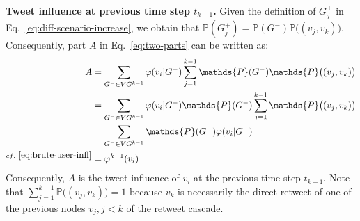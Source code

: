 \textbf{Tweet influence at previous time step $t_{k-1}$.}
Given the definition of $G_j^+$ in Eq.~\eqref{eq:diff-scenario-increase}, we obtain that $\mathds{P}(G_j^+) = \mathds{P}(G^-)\mathds{P}\big((v_j,v_k)\big)$.
Consequently, part $A$ in Eq.~\eqref{eq:two-parts} can be written as:
\begin{align}
	A 	&= \sum_{G^- \in {VG^{k-1}}} \varphi(v_i | G^-) \sum^{k-1}_{j=1} \mathds{P}(G^-)\mathds{P}\big((v_j,v_k)\big) \nonumber \\
		&= \sum_{G^- \in {VG^{k-1}}} \varphi(v_i | G^-) \mathds{P}(G^-) \sum^{k-1}_{j=1} \mathds{P}\big((v_j,v_k)\big) \nonumber \\
		&= \sum_{G^- \in {VG^{k-1}}} \mathds{P}(G^-) \varphi(v_i | G^-)  \nonumber \\
	^{cf.~\eqref{eq:brute-user-infl}}	&= \varphi^{k-1}(v_i) \label{eq:past-infl}
\end{align}
Consequently, $A$ is the tweet influence of $v_i$ at the previous time step $t_{k-1}$.
Note that $\sum^{k-1}_{j=1} \mathds{P}\big((v_j,v_k)\big) = 1$ because $v_k$ is necessarily the direct retweet of one of the previous nodes $v_j, j < k$ of the retweet cascade.
%

